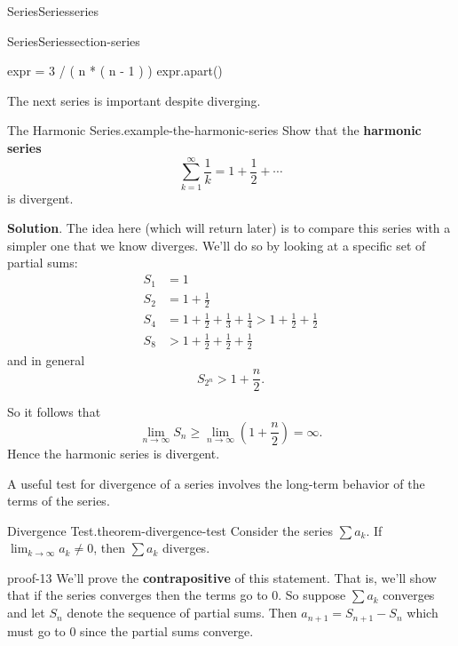 \documentclass[oneside,10pt,]{book}
\newcommand{\terminology}[1]{\textbf{#1}}
\numberwithin{equation}{section}
\newcommand{\gt}{>}
\newcommand{\amp}{&}
\begin{document}
\begin{chapterptx}{Series}{}{Series}{}{}{series}
\begin{sectionptx}{Series}{}{Series}{}{}{section-series}
\begin{sageinput}
expr = 3 / ( n * ( n - 1 ) )
expr.apart()
\end{sageinput}
\hypertarget{p-859}{}%
The next series is important despite diverging.%
\begin{example}{The Harmonic Series.}{example-the-harmonic-series}%
\hypertarget{p-860}{}%
Show that the \terminology{harmonic series}%
\begin{equation*}
\sum_{k=1}^{\infty}\frac{1}{k} = 1 + \frac{1}{2} + \cdots
\end{equation*}
is divergent.%
\par\smallskip%
\noindent\textbf{Solution}.\hypertarget{solution-179}{}\quad%
\hypertarget{p-861}{}%
The idea here (which will return later) is to compare this series with a simpler one that we know diverges. We'll do so by looking at a specific set of partial sums:%
\begin{align*}
S_{1} \amp = 1 \\
S_{2} \amp = 1 + \frac{1}{2} \\
S_{4} \amp = 1 + \frac{1}{2} + \frac{1}{3} + \frac{1}{4} \gt 1 + \frac{1}{2} + \frac{1}{2} \\
S_{8} \amp \gt 1 + \frac{1}{2} + \frac{1}{2} + \frac{1}{2} 
\end{align*}
and in general%
\begin{equation*}
S_{2^{n}} \gt 1 + \frac{n}{2}\text{.}
\end{equation*}
%
\par
\hypertarget{p-862}{}%
So it follows that%
\begin{equation*}
\lim_{n\to\infty}S_{n} \geq \lim_{n\to\infty}\left(1 + \frac{n}{2}\right) = \infty\text{.}
\end{equation*}
Hence the harmonic series is divergent.%
\end{example}
\hypertarget{p-863}{}%
A useful test for divergence of a series involves the long-term behavior of the terms of the series.%
\begin{theorem}{Divergence Test.}{}{theorem-divergence-test}%
\hypertarget{p-864}{}%
Consider the series \(\sum a_{k}\). If \(\lim_{k\to\infty}a_{k}\neq0\), then \(\sum a_{k}\) diverges.%
\end{theorem}
\begin{proofptx}{}{proof-13}
\hypertarget{p-865}{}%
We'll prove the \terminology{contrapositive} of this statement. That is, we'll show that if the series converges then the terms go to \(0\). So suppose \(\sum a_{k}\) converges and let \(S_{n}\) denote the sequence of partial sums. Then \(a_{n+1} = S_{n+1} - S_{n}\) which must go to \(0\) since the partial sums converge.%

\end{proofptx}
\end{sectionptx}
\end{chapterptx}
\end{document}
